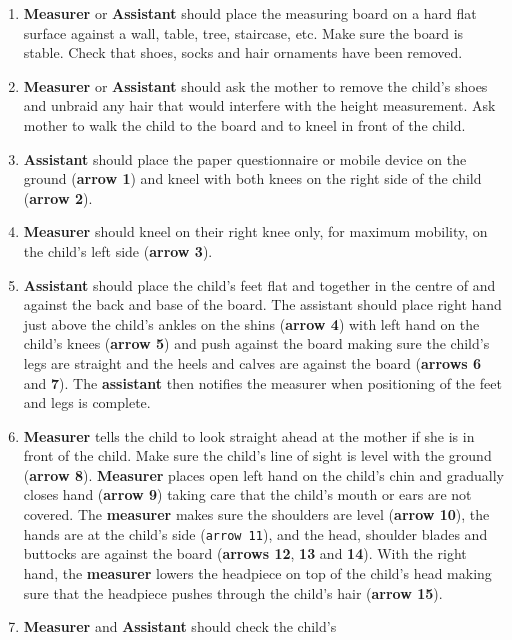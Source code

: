 \documentclass[12pt,]{book}
\theoremstyle{definition}
\theoremstyle{definition}
\theoremstyle{definition}
\theoremstyle{remark}
\begin{document}
\begin{enumerate}
\def\labelenumi{\arabic{enumi}.}
\item
  \textbf{Measurer} or \textbf{Assistant} should place the measuring
  board on a hard flat surface against a wall, table, tree, staircase,
  etc. Make sure the board is stable. Check that shoes, socks and hair
  ornaments have been removed.
\item
  \textbf{Measurer} or \textbf{Assistant} should ask the mother to
  remove the child's shoes and unbraid any hair that would interfere
  with the height measurement. Ask mother to walk the child to the board
  and to kneel in front of the child.
\item
  \textbf{Assistant} should place the paper questionnaire or mobile
  device on the ground (\textbf{arrow 1}) and kneel with both knees on
  the right side of the child (\textbf{arrow 2}).
\item
  \textbf{Measurer} should kneel on their right knee only, for maximum
  mobility, on the child's left side (\textbf{arrow 3}).
\item
  \textbf{Assistant} should place the child's feet flat and together in
  the centre of and against the back and base of the board. The
  assistant should place right hand just above the child's ankles on the
  shins (\textbf{arrow 4}) with left hand on the child's knees
  (\textbf{arrow 5}) and push against the board making sure the child's
  legs are straight and the heels and calves are against the board
  (\textbf{arrows 6} and \textbf{7}). The \textbf{assistant} then
  notifies the measurer when positioning of the feet and legs is
  complete.
\item
  \textbf{Measurer} tells the child to look straight ahead at the mother
  if she is in front of the child. Make sure the child's line of sight
  is level with the ground (\textbf{arrow 8}). \textbf{Measurer} places
  open left hand on the child's chin and gradually closes hand
  (\textbf{arrow 9}) taking care that the child's mouth or ears are not
  covered. The \textbf{measurer} makes sure the shoulders are level
  (\textbf{arrow 10}), the hands are at the child's side
  (\texttt{arrow\ 11}), and the head, shoulder blades and buttocks are
  against the board (\textbf{arrows 12}, \textbf{13} and \textbf{14}).
  With the right hand, the \textbf{measurer} lowers the headpiece on top
  of the child's head making sure that the headpiece pushes through the
  child's hair (\textbf{arrow 15}).
\item
  \textbf{Measurer} and \textbf{Assistant} should check the child's

\end{enumerate}
\end{document}
